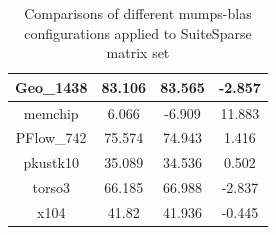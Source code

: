 \begin{table}[h!]
\begin{tabular}{|c|c|c|c|}
Geo\_1438                                             & 83.106                                                                                                  & 83.565                                                                                               & -2.857                                                                                                  \\ \hline
memchip                                               & 6.066                                                                                                   & -6.909                                                                                               & 11.883                                                                                                  \\ \hline
PFlow\_742                                            & 75.574                                                                                                  & 74.943                                                                                               & 1.416                                                                                                   \\ \hline
pkustk10                                              & 35.089                                                                                                  & 34.536                                                                                               & 0.502                                                                                                   \\ \hline
torso3                                                & 66.185                                                                                                  & 66.988                                                                                               & -2.837                                                                                                  \\ \hline
x104                                                  & 41.82                                                                                                   & 41.936                                                                                               & -0.445                                                                                                  \\ \hline
\end{tabular}
\caption{Comparisons of different \acrshort{mumps}-\acrshort{blas} configurations applied to SuiteSparse matrix set}
\label{table:mumps-blas-performance-gain-suitesprase}
\end{table}


